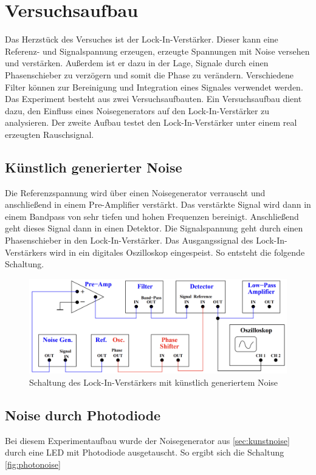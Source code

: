%

%
\section{Versuchsaufbau}
Das Herzstück des Versuches ist der Lock-In-Verstärker. Dieser kann eine Referenz- und Signalspannung erzeugen, erzeugte Spannungen mit 
Noise versehen und verstärken. Außerdem ist er dazu in der Lage, Signale durch einen Phasenschieber zu verzögern und somit die Phase zu 
verändern. Verschiedene Filter können zur Bereinigung und Integration eines Signales verwendet werden.\\
\noindent
Das Experiment besteht aus zwei Versuchsaufbauten. 
Ein Versuchsaufbau dient dazu, den Einfluss eines Noisegenerators auf den Lock-In-Verstärker zu analysieren. Der zweite Aufbau testet 
den Lock-In-Verstärker unter einem real erzeugten Rauschsignal.

\subsection{Künstlich generierter Noise}
\label{sec:kunstnoise}
Die Referenzspannung wird über einen Noisegenerator verrauscht und anschließend in einem Pre-Amplifier verstärkt. Das verstärkte Signal 
wird dann in einem Bandpass von sehr tiefen und hohen Frequenzen bereinigt. Anschließend geht dieses Signal dann in einen Detektor.
Die Signalspannung geht durch einen Phasenschieber in den Lock-In-Verstärker. Das Ausgangssignal des Lock-In-Verstärkers wird in ein digitales 
Oszilloskop eingespeist. So entsteht die folgende Schaltung.

\begin{figure}[H]
    \includegraphics[width=\textwidth]{./content/Schaltung_kunstliche.png}
    \caption{Schaltung des Lock-In-Verstärkers mit künstlich generiertem Noise \cite{Versuchsanleitung_v303}}
    \label{fig:kunstnoise}
\end{figure}

\subsection{Noise durch Photodiode}
\noindent
Bei diesem Experimentaufbau wurde der Noisegenerator aus \autoref{sec:kunstnoise} durch eine LED mit Photodiode ausgetauscht. So ergibt sich 
die Schaltung \ref{fig:photonoise}

